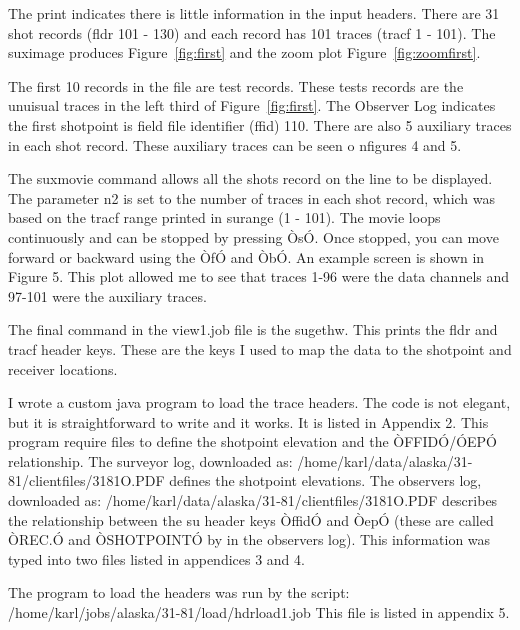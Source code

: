 The print indicates there is little information in the input headers.
There are 31 shot records (fldr 101 - 130) and each record has 101
traces (tracf 1 - 101).  The suximage produces Figure~\ref{fig:first}
and the zoom plot Figure~\ref{fig:zoomfirst}.

The first 10 records in the file are test records.  These tests
records are the unuisual traces in the left third of
Figure~\ref{fig:first}. The Observer Log indicates the first shotpoint
is field file identifier (ffid) 110.  There are also 5 auxiliary
traces in each shot record.  These auxiliary traces can be seen o
nfigures 4 and 5.

The suxmovie command allows all the shots record on the line to be
displayed.  The parameter n2 is set to the number of traces in each
shot record, which was based on the tracf range printed in surange (1
- 101).  The movie loops continuously and can be stopped by pressing
ÒsÓ.  Once stopped, you can move forward or backward using the ÒfÓ and
ÒbÓ.  An example screen is shown in Figure 5.  This plot allowed me to
see that traces 1-96 were the data channels and 97-101 were the
auxiliary traces.

The final command in the view1.job file is the sugethw.  This prints
the fldr and tracf header keys.  These are the keys I used to map the
data to the shotpoint and receiver locations.

I wrote a custom java program to load the trace headers.  The code is
not elegant, but it is straightforward to write and it works.  It is
listed in Appendix 2.  This program require files to define the
shotpoint elevation and the ÒFFIDÓ/ÓEPÓ relationship.  The surveyor
log, downloaded as: /home/karl/data/alaska/31-81/clientfiles/3181O.PDF
defines the shotpoint elevations.  The observers log, downloaded as:
/home/karl/data/alaska/31-81/clientfiles/3181O.PDF describes the
relationship between the su header keys ÒffidÓ and ÒepÓ (these are
called ÒREC.Ó and ÒSHOTPOINTÓ by in the observers log).  This
information was typed into two files listed in appendices 3 and 4.

The program to load the headers was run by the script:
/home/karl/jobs/alaska/31-81/load/hdrload1.job This file is listed in
appendix 5.

